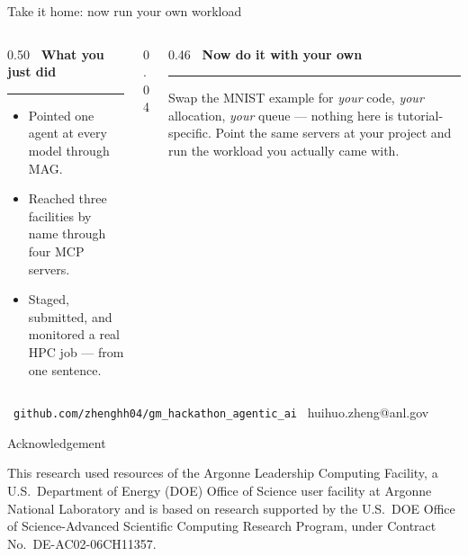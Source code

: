 \documentclass[aspectratio=169,11pt]{beamer}
\makeatletter
\newcommand{\deckemail}{huihuo.zheng@anl.gov}
\newcommand{\sechead}[2]{{\small\color{#1}\bfseries #2}\par\vspace{1.5pt}%
  {\color{#1!45}\rule{\linewidth}{0.6pt}}\par\vspace{4pt}}
\makeatother
\begin{document}
\begin{frame}{Take it home: now run your own workload}
  \begin{columns}[T,totalwidth=\textwidth]
    \begin{column}{0.50\textwidth}
      \sechead{labnavy}{\faCheckCircle\ What you just did}
      \scriptsize
      \begin{itemize}\setlength\itemsep{4pt}
        \item[\faComments] Pointed one agent at every model through MAG.
        \item[\faServer] Reached three facilities by name through four MCP
          servers.
        \item[\faRocket] Staged, submitted, and monitored a real HPC job ---
          from one sentence.
      \end{itemize}
    \end{column}
    \begin{column}{0.04\textwidth}\end{column}
    \begin{column}{0.46\textwidth}
      \sechead{accentteal}{\faRocket\ Now do it with your own}
      \scriptsize
      Swap the MNIST example for \emph{your} code, \emph{your} allocation,
      \emph{your} queue --- nothing here is tutorial-specific. Point the same
      servers at your project and run the workload you actually came with.
    \end{column}
  \end{columns}
  \vspace{7pt}
  \begin{center}
    {\small\color{midgray}\faGithub\
     \texttt{github.com/zhenghh04/gm\_hackathon\_agentic\_ai}
     \quad\textperiodcentered\quad \faEnvelope[regular]\ \deckemail}
  \end{center}
\end{frame}

\begin{frame}[plain]{Acknowledgement}
  \vfill
  \begin{center}
  \begin{minipage}{0.85\textwidth}
    \small
    This research used resources of the Argonne Leadership Computing
    Facility, a U.S.\ Department of Energy (DOE) Office of Science user
    facility at Argonne National Laboratory and is based on research
    supported by the U.S.\ DOE Office of Science-Advanced Scientific
    Computing Research Program, under Contract No.\ DE-AC02-06CH11357.
  \end{minipage}
  \end{center}
  \vfill
\end{frame}
\end{document}
